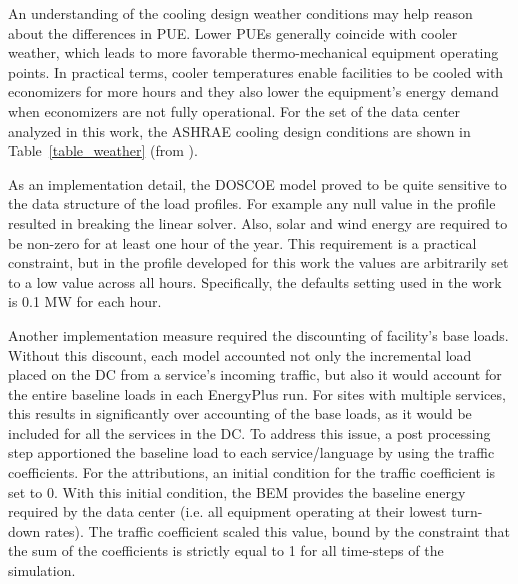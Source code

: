 An understanding of the cooling design weather conditions may help reason about the differences in PUE. Lower PUEs generally coincide with cooler weather, which leads to more favorable thermo-mechanical equipment operating points. In practical terms, cooler temperatures enable facilities to be cooled with economizers for more hours and they also lower the equipment's energy demand when economizers are not fully operational. For the set of the data center analyzed in this work, the ASHRAE cooling design conditions are shown in Table~\ref{table_weather} (from \cite{ASHRAE_2009}).




As an implementation detail, the DOSCOE model proved to be quite sensitive to the data structure of the load profiles. For example any null value in the profile resulted in breaking the linear solver. Also, solar and wind energy are required to be non-zero for at least one hour of the year. This requirement is a practical constraint, but in the profile developed for this work the values are arbitrarily set to a low value across all hours. Specifically, the defaults setting used in the work is 0.1 MW for each hour. 

Another implementation measure required the discounting of facility's base loads. Without this discount, each model accounted not only the incremental load placed on the DC from a service's incoming traffic, but also it would account for the entire baseline loads in each EnergyPlus run. For sites with multiple services, this results in significantly over accounting of the base loads, as it would be included for all the services in the DC.  To address this issue, a post processing step apportioned the baseline load to each service/language by using the traffic coefficients. For the attributions, an initial condition for the traffic coefficient is set to 0. With this initial condition, the BEM provides the baseline energy required by the data center (i.e. all equipment operating at their lowest turn-down rates). The traffic coefficient scaled this value, bound by the constraint that the sum of the coefficients is strictly equal to 1 for all time-steps of the simulation.


